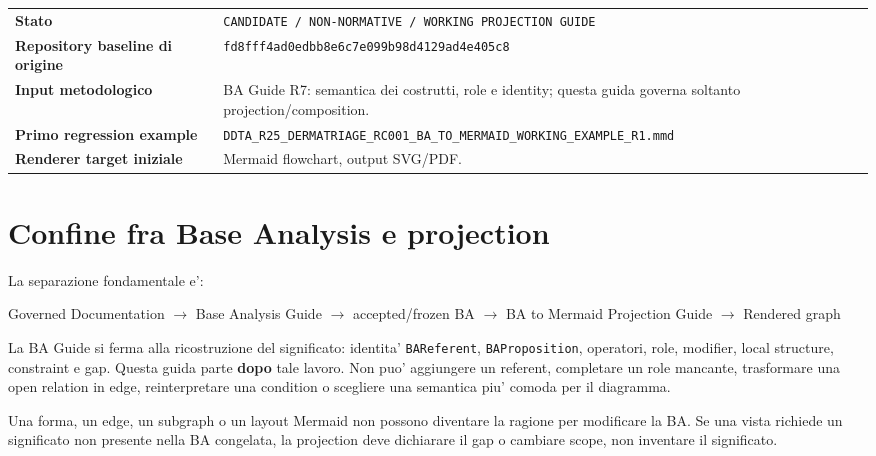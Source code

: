\documentclass[11pt,a4paper]{article}
\newcommand{\BAR}{\texttt{BAReferent}}
\newcommand{\BAP}{\texttt{BAProposition}}
\begin{document}
\begin{titlepage}
\vfill
\begin{tabularx}{0.94\textwidth}{L{48mm}Y}
\toprule
\textbf{Stato} & \texttt{CANDIDATE / NON-NORMATIVE / WORKING PROJECTION GUIDE} \\
\textbf{Repository baseline di origine} & \texttt{fd8fff4ad0edbb8e6c7e099b98d4129ad4e405c8} \\
\textbf{Input metodologico} & BA Guide R7: semantica dei costrutti, role e identity; questa guida governa soltanto projection/composition. \\
\textbf{Primo regression example} & \nolinkurl{DDTA_R25_DERMATRIAGE_RC001_BA_TO_MERMAID_WORKING_EXAMPLE_R1.mmd} \\
\textbf{Renderer target iniziale} & Mermaid flowchart, output SVG/PDF. \\
\bottomrule
\end{tabularx}
\end{titlepage}

\section{Confine fra Base Analysis e projection}

La separazione fondamentale e':

\begin{center}
\begin{tcolorbox}[width=0.92\textwidth,colback=DDTALightGray,colframe=DDTAGray!55,boxrule=0.5pt,arc=2pt]
\centering\sffamily
Governed Documentation $\longrightarrow$ Base Analysis Guide $\longrightarrow$ accepted/frozen BA $\longrightarrow$ BA to Mermaid Projection Guide $\longrightarrow$ Rendered graph
\end{tcolorbox}
\end{center}

La BA Guide si ferma alla ricostruzione del significato: identita' \BAR{}, \BAP{}, operatori, role, modifier, local structure, constraint e gap. Questa guida parte \textbf{dopo} tale lavoro. Non puo' aggiungere un referent, completare un role mancante, trasformare una open relation in edge, reinterpretare una condition o scegliere una semantica piu' comoda per il diagramma.

\begin{ddtaprinciple}[title={No reverse inference}]
Una forma, un edge, un subgraph o un layout Mermaid non possono diventare la ragione per modificare la BA. Se una vista richiede un significato non presente nella BA congelata, la projection deve dichiarare il gap o cambiare scope, non inventare il significato.
\end{ddtaprinciple}
\end{document}
